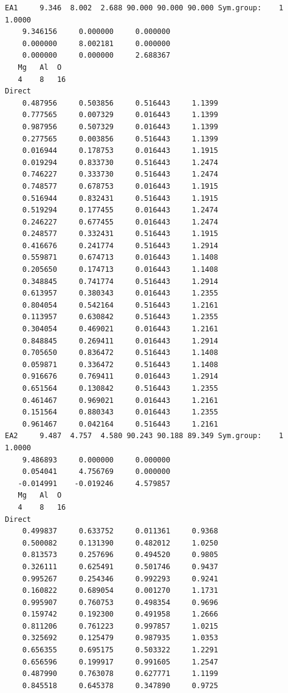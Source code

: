 \documentclass[12pt]{article}
\begin{document}
\begin{itemize}
{\tiny
\begin{verbatim}
EA1     9.346  8.002  2.688 90.000 90.000 90.000 Sym.group:    1
1.0000
    9.346156     0.000000     0.000000
    0.000000     8.002181     0.000000
    0.000000     0.000000     2.688367
   Mg   Al  O
   4    8   16 
Direct
    0.487956     0.503856     0.516443     1.1399
    0.777565     0.007329     0.016443     1.1399
    0.987956     0.507329     0.016443     1.1399
    0.277565     0.003856     0.516443     1.1399
    0.016944     0.178753     0.016443     1.1915
    0.019294     0.833730     0.516443     1.2474
    0.746227     0.333730     0.516443     1.2474
    0.748577     0.678753     0.016443     1.1915
    0.516944     0.832431     0.516443     1.1915
    0.519294     0.177455     0.016443     1.2474
    0.246227     0.677455     0.016443     1.2474
    0.248577     0.332431     0.516443     1.1915
    0.416676     0.241774     0.516443     1.2914
    0.559871     0.674713     0.016443     1.1408
    0.205650     0.174713     0.016443     1.1408
    0.348845     0.741774     0.516443     1.2914
    0.613957     0.380343     0.016443     1.2355
    0.804054     0.542164     0.516443     1.2161
    0.113957     0.630842     0.516443     1.2355
    0.304054     0.469021     0.016443     1.2161
    0.848845     0.269411     0.016443     1.2914
    0.705650     0.836472     0.516443     1.1408
    0.059871     0.336472     0.516443     1.1408
    0.916676     0.769411     0.016443     1.2914
    0.651564     0.130842     0.516443     1.2355
    0.461467     0.969021     0.016443     1.2161
    0.151564     0.880343     0.016443     1.2355
    0.961467     0.042164     0.516443     1.2161
EA2     9.487  4.757  4.580 90.243 90.188 89.349 Sym.group:    1
1.0000
    9.486893     0.000000     0.000000
    0.054041     4.756769     0.000000
   -0.014991    -0.019246     4.579857
   Mg   Al  O
   4    8   16 
Direct
    0.499837     0.633752     0.011361     0.9368
    0.500082     0.131390     0.482012     1.0250
    0.813573     0.257696     0.494520     0.9805
    0.326111     0.625491     0.501746     0.9437
    0.995267     0.254346     0.992293     0.9241
    0.160822     0.689054     0.001270     1.1731
    0.995907     0.760753     0.498354     0.9696
    0.159742     0.192300     0.491958     1.2666
    0.811206     0.761223     0.997857     1.0215
    0.325692     0.125479     0.987935     1.0353
    0.656355     0.695175     0.503322     1.2291
    0.656596     0.199917     0.991605     1.2547
    0.487990     0.763078     0.627771     1.1199
    0.845518     0.645378     0.347890     0.9725

\end{verbatim}}
\end{itemize}
\end{document}
